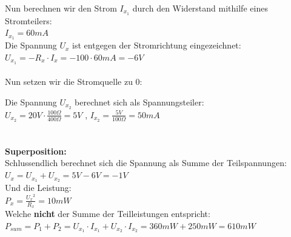 																					Nun berechnen wir den Strom $I_{x_1}$ durch den Widerstand mithilfe eines Stromteilers: \\
																					$I_{x_1} = 60mA$ \\
																					Die Spannung $U_x$ ist entgegen der Stromrichtung eingezeichnet: \\
																					$U_{x_1} = - R_x \cdot I_x = - 100 \cdot 60mA = -6V $ \\
																					\\
																					Nun setzen wir die Stromquelle zu 0: \\
																					\begin{center}
																						\fix
																					\end{center}

																					Die Spannung $U_{x_2}$ berechnet sich als Spannungsteiler: \\
																					$U_{x_2} = 20V \cdot \frac{100\Omega}{400\Omega} = 5V$ , $ I_{x_2} = \frac{5V}{100\Omega} = 50mA $\\
																					\\
																					\\
																					\textbf{Superposition:} \\
																					Schlussendlich berechnet sich die Spannung als Summe der Teilspannungen:
																					$\displaystyle U_x = U_{x_1} + U_{x_2} = 5V -6V = -1V $ \\
																					Und die Leistung: \\
																					$\displaystyle P_x = \frac{{U_x}^2}{R_x} = 10mW$ \\
																					Welche \textbf{nicht} der Summe der Teilleistungen entspricht: \\
																					$\displaystyle P_{sum} = P_1 + P_2 = U_{x_1} \cdot I_{x_1} + U_{x_2} \cdot I_{x_2} = 360mW + 250mW = 610mW$


